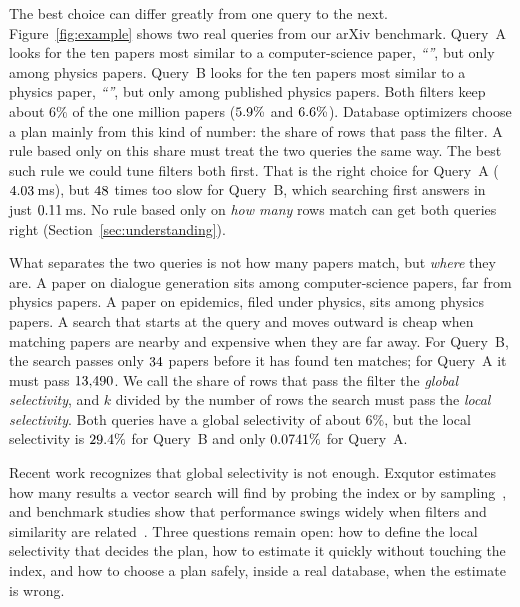\documentclass[sigconf,nonacm]{acmart}
\begin{document}
The best choice can differ greatly from one query to the next. Figure~\ref{fig:example} shows two real queries from our arXiv benchmark. Query~A looks for the ten papers most similar to a computer-science paper, \emph{``\ExATitle''}, but only among physics papers. Query~B looks for the ten papers most similar to a physics paper, \emph{``\ExBTitle''}, but only among published physics papers. Both filters keep about $6\%$ of the one million papers ($5.9\%$ and $6.6\%$). Database optimizers choose a plan mainly from this kind of number: the share of rows that pass the filter. A rule based only on this share must treat the two queries the same way. The best such rule we could tune filters both first. That is the right choice for Query~A ($4.03$\,ms), but $48$ times too slow for Query~B, which searching first answers in just $0.11$\,ms. No rule based only on \emph{how many} rows match can get both queries right (Section~\ref{sec:understanding}).

What separates the two queries is not how many papers match, but \emph{where} they are. A paper on dialogue generation sits among computer-science papers, far from physics papers. A paper on epidemics, filed under physics, sits among physics papers. A search that starts at the query and moves outward is cheap when matching papers are nearby and expensive when they are far away. For Query~B, the search passes only $34$ papers before it has found ten matches; for Query~A it must pass $13{,}490$. We call the share of rows that pass the filter the \emph{global selectivity}, and $k$ divided by the number of rows the search must pass the \emph{local selectivity}. Both queries have a global selectivity of about $6\%$, but the local selectivity is $29.4\%$ for Query~B and only $0.0741\%$ for Query~A.

Recent work recognizes that global selectivity is not enough. Exqutor estimates how many results a vector search will find by probing the index or by sampling~\cite{exqutor2026}, and benchmark studies show that performance swings widely when filters and similarity are related~\cite{amanbayev2026fanns,iff2025benchmark,shi2025unified}. Three questions remain open: how to define the local selectivity that decides the plan, how to estimate it quickly without touching the index, and how to choose a plan safely, inside a real database, when the estimate is wrong.
\end{document}
